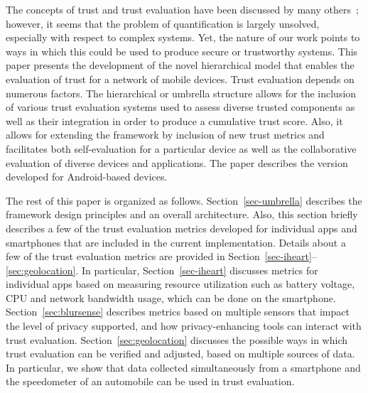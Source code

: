 The concepts of trust and trust evaluation have been discussed by many others~\cite{jing2014riskmon,shabtai2010google,zheng2014droidray}; 
however, it seems that the problem  of quantification is largely unsolved, especially with respect to complex systems.
 Yet, the nature of our work points to ways in which 
this could be used to produce secure or trustworthy systems.  
This paper presents the development of the novel hierarchical model that enables the  evaluation of trust for a 
network of mobile devices. Trust evaluation depends on numerous factors. The hierarchical or umbrella structure allows for the
inclusion of various trust evaluation systems used to assess diverse trusted components as well as their integration 
in order to produce a cumulative trust score. Also, it allows for extending the framework by inclusion of new trust 
metrics and facilitates both self-evaluation for a particular device as well as the collaborative evaluation of 
diverse devices and applications. 
The paper describes the version developed for Android-based devices.

The rest of this paper is organized as follows. 
Section~\ref{sec-umbrella} describes the framework design principles and an overall architecture. Also, this section 
 briefly describes a few of the trust evaluation metrics developed for individual apps and
smartphones that are included in the current implementation.
Details about a few of the trust evaluation metrics are provided in Section~\ref{sec-iheart}--\ref{sec:geolocation}. In particular, Section~\ref{sec-iheart} discusses metrics 
for individual apps based on measuring resource utilization such as battery voltage, CPU and network bandwidth usage,
which can be done on the smartphone.
Section~\ref{sec:blursense} describes metrics based on multiple sensors that impact the level of privacy supported, and how 
privacy-enhancing tools can interact with trust evaluation.
Section~\ref{sec:geolocation} discusses the possible ways in which trust evaluation can be verified and adjusted, based on multiple sources
of data.  In particular, we show that data collected simultaneously from a smartphone and the speedometer of an 
automobile can be used in trust evaluation.
